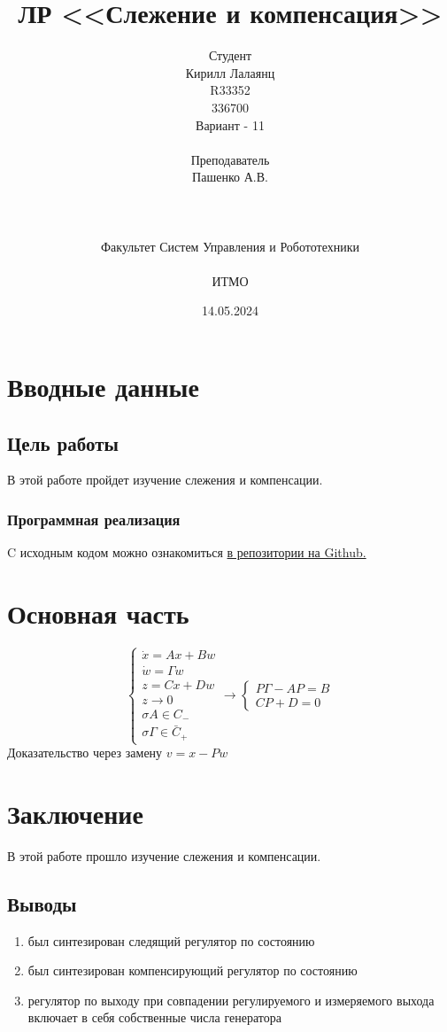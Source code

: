 \documentclass[16pt]{article}
\title{ЛР \textnumero 12 <<Слежение и компенсация>>}
\author{
Студент \\
Кирилл Лалаянц\\
R33352\\
336700\\
Вариант - 11\\
\\
Преподаватель\\
Пашенко А.В. \\
\\
\\
\\
Факультет Систем Управления и Робототехники\\
\\
ИТМО\\
}
\date{14.05.2024}
\begin{document}
\maketitle
\newpage
\tableofcontents
\thispagestyle{empty}

\newpage
\setcounter{page}{1}
\section{Вводные данные}
\subsection{Цель работы}
В этой работе пройдет изучение слежения и компенсации.

\subsubsection{Программная реализация}
C исходным кодом можно ознакомиться \href{https://github.com/lalayants/control-theory-itmo-2023-2024}{в репозитории на Github.}


\newpage
\section{Основная часть}
\[
\begin{cases}
   \dot x = Ax + Bw \\
   \dot w = \Gamma w \\
   z = Cx + Dw \\ 
   z \rightarrow 0 \\
   \sigma A \in C_- \\
   \sigma \Gamma \in \bar C_+
\end{cases} \rightarrow
\begin{cases}
   P \Gamma - AP = B \\
   C P + D = 0
\end{cases}
\]
Доказательство через замену \(v = x - Pw\)

\FloatBarrier


\FloatBarrier


\FloatBarrier


\FloatBarrier

% 

\newpage
\section{Заключение}
В этой работе прошло изучение слежения и компенсации.
\subsection{Выводы}
\begin{enumerate}
   \item был синтезирован следящий регулятор по состоянию
   \item был синтезирован компенсирующий регулятор по состоянию
   \item регулятор по выходу при совпадении регулируемого и измеряемого выхода включает в себя собственные числа генератора
\end{enumerate}
\end{document}

